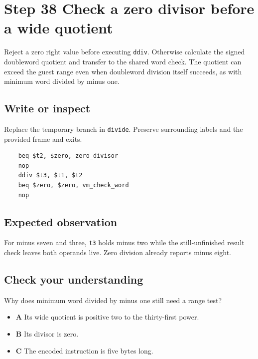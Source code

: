 \section{Step 38 Check a zero divisor before a wide quotient}\label{vm-s38}

Reject a zero right value before executing \texttt{ddiv}. Otherwise calculate the signed doubleword quotient and transfer to the shared word check. The quotient can exceed the guest range even when doubleword division itself succeeds, as with minimum word divided by minus one.

\subsection{Write or inspect}
Replace the temporary branch in \texttt{divide}. Preserve surrounding labels and the provided frame and exits.

\begin{verbatim}
    beq $t2, $zero, zero_divisor
    nop
    ddiv $t3, $t1, $t2
    beq $zero, $zero, vm_check_word
    nop
\end{verbatim}
\subsection{Expected observation}
For minus seven and three, \texttt{t3} holds minus two while the still-unfinished result check leaves both operands live. Zero division already reports minus eight.

\subsection{Check your understanding}
Why does minimum word divided by minus one still need a range test?

\begin{itemize}
  \item \textbf{A} Its wide quotient is positive two to the thirty-first power.
  \item \textbf{B} Its divisor is zero.
  \item \textbf{C} The encoded instruction is five bytes long.
\end{itemize}
